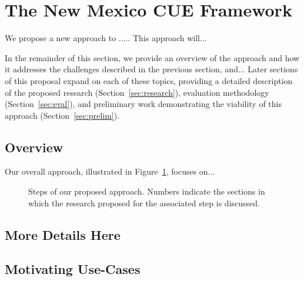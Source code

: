 \section{The New Mexico CUE Framework}
\label{sec:approach}

We propose a new approach to .....
This approach will... 

In the remainder of this section, we provide an overview of the approach and how it 
addresses the challenges described in the previous section, and...
Later sections of this proposal
expand on each of these topics, providing a detailed description of the
proposed research (Section~\ref{sec:research}), evaluation methodology
(Section~\ref{sec:eval}), and preliminary work demonstrating the viability of
this approach (Section~\ref{sec:prelim}).

\subsection{Overview}
Our overall approach, illustrated in Figure~\ref{fig:overview}, focuses on...
\begin{figure}
\begin{center}
\end{center}
\caption{Steps of our proposed approach. Numbers indicate the sections in which the research 
  proposed for the associated step is discussed.}
\label{fig:overview}
\end{figure}

\subsection{More Details Here}

\subsection{Motivating Use-Cases}

